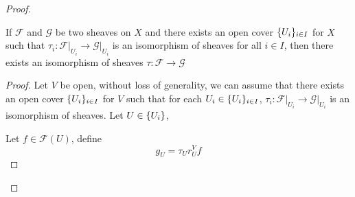\documentclass{article}
\begin{document}
\begin{lemma}
\begin{proof}
\begin{lemma}
    If $\mathcal{F}$ and $\mathcal{G}$ be two sheaves on $X$ and there exists an open cover $\{U_i\}_{i \in I}$ for $X$ such that $\tau_i: \mathcal{F}\vert_{U_i} \to \mathcal{G}\vert_{U_i}$ is an isomorphism of sheaves for all $i \in I$, then there exists an isomorphism of sheaves $\tau: \mathcal{F} \to \mathcal{G}$
\begin{proof}
    Let $V$ be open, without loss of generality, we can assume that there exists an open cover $\{U_i\}_{i \in I}$ for $V$ such that for each $U_i \in \{U_i\}_{i \in I}$, $\tau_i: \mathcal{F}\vert_{U_i} \to \mathcal{G}\vert_{U_i}$ is an isomorphism of sheaves. Let $U \in \{U_i\}$,
    \begin{center}
    \end{center}

    Let $f \in \mathcal{F}(U)$, define
    $$
        g_U = \tau_U r^V_U f
    $$


\end{proof}
\end{lemma}
\end{proof}
\end{lemma}
\end{document}
